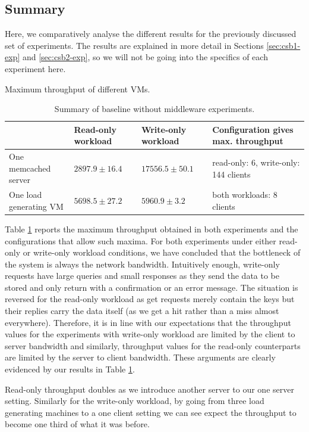 \documentclass[11pt,a4paper]{article}
\begin{document}
\subsection{Summary} \label{sec:csb-summary}
Here, we comparatively analyse the different results for the previously discussed set of experiments. The results are explained in more detail in Sections \ref{sec:csb1-exp} and \ref{sec:csb2-exp}, so we will not be going into the specifics of each experiment here.
\begin{table}[h]
\small
\centering
{Maximum throughput of different VMs.}
\begin{tabular}{|l|p{2.1cm}|p{2.2cm}|p{6cm}|}
\hline 	                      & Read-only workload & Write-only workload & Configuration gives max. throughput \\ 
\hline One memcached server & $2897.9 \pm 16.4$ & $17556.5 \pm 50.1$ & read-only: 6, write-only: 144 clients \\ 
\hline One load generating VM & $5698.5 \pm 27.2$ & $5960.9 \pm 3.2$   & both workloads: 8 clients \\ 
\hline 
\end{tabular}
\caption{Summary of baseline without middleware experiments.} \label{tab:csb-summary}
\end{table}
\par Table \ref{tab:csb-summary} reports the maximum throughput obtained in both experiments and the configurations that allow such maxima. For both experiments under either read-only or write-only workload conditions, we have concluded that the bottleneck of the system is always the network bandwidth. Intuitively enough, write-only requests have large queries and small responses as they send the data to be stored and only return with a confirmation or an error message. The situation is reversed for the read-only workload as get requests merely contain the keys but their replies carry the data itself (as we get a hit rather than a miss almost everywhere). Therefore, it is in line with our expectations that the throughput values for the experiments with write-only workload are limited by the client to server bandwidth and similarly, throughput values for the read-only counterparts are limited by the server to client bandwidth. These arguments are clearly evidenced by our results in Table \ref{tab:csb-summary}. 
\par Read-only throughput doubles as we introduce another server to our one server setting. Similarly for the write-only workload, by going from three load generating machines to a one client setting we can see expect the throughput to become one third of what it was before.
\end{document}
